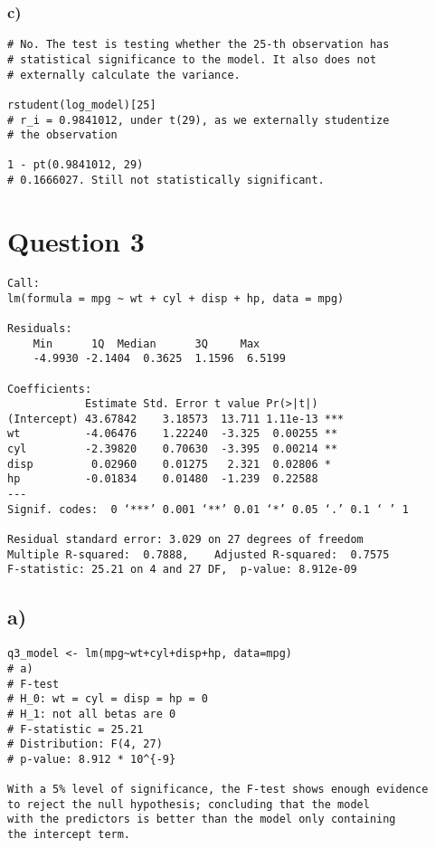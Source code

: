 \documentclass{article}
\begin{document}
\subsubsection*{c)}
\begin{verbatim}
# No. The test is testing whether the 25-th observation has
# statistical significance to the model. It also does not 
# externally calculate the variance.

rstudent(log_model)[25]
# r_i = 0.9841012, under t(29), as we externally studentize
# the observation

1 - pt(0.9841012, 29)
# 0.1666027. Still not statistically significant. 
\end{verbatim}

\section*{Question 3}
\begin{verbatim}
Call:
lm(formula = mpg ~ wt + cyl + disp + hp, data = mpg)
    
Residuals:
    Min      1Q  Median      3Q     Max 
    -4.9930 -2.1404  0.3625  1.1596  6.5199 
    
Coefficients:
            Estimate Std. Error t value Pr(>|t|)    
(Intercept) 43.67842    3.18573  13.711 1.11e-13 ***
wt          -4.06476    1.22240  -3.325  0.00255 ** 
cyl         -2.39820    0.70630  -3.395  0.00214 ** 
disp         0.02960    0.01275   2.321  0.02806 *  
hp          -0.01834    0.01480  -1.239  0.22588    
---
Signif. codes:  0 ‘***’ 0.001 ‘**’ 0.01 ‘*’ 0.05 ‘.’ 0.1 ‘ ’ 1
    
Residual standard error: 3.029 on 27 degrees of freedom
Multiple R-squared:  0.7888,	Adjusted R-squared:  0.7575 
F-statistic: 25.21 on 4 and 27 DF,  p-value: 8.912e-09
\end{verbatim}
\subsection*{a)}
\begin{verbatim}
q3_model <- lm(mpg~wt+cyl+disp+hp, data=mpg)
# a)
# F-test
# H_0: wt = cyl = disp = hp = 0
# H_1: not all betas are 0
# F-statistic = 25.21
# Distribution: F(4, 27)
# p-value: 8.912 * 10^{-9}

With a 5% level of significance, the F-test shows enough evidence
to reject the null hypothesis; concluding that the model
with the predictors is better than the model only containing
the intercept term. 
\end{verbatim}
\end{document}
